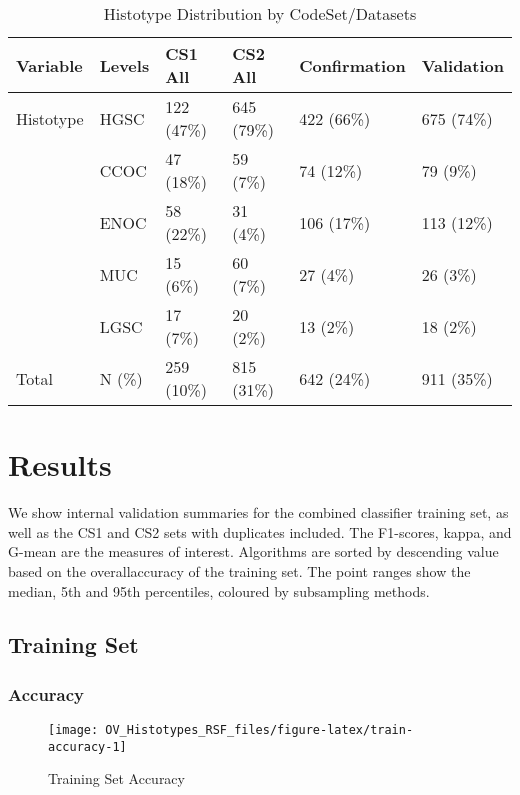 \documentclass[
]{report}
\begin{document}
\begin{table}

\caption{\label{tab:hist-codeset-dataset}Histotype Distribution by CodeSet/Datasets}
\centering
\begin{tabular}[t]{l|l|l|l|l|l}
\hline
Variable & Levels & CS1 All & CS2 All & Confirmation & Validation\\
\hline
Histotype & HGSC & 122 (47\%) & 645 (79\%) & 422 (66\%) & 675 (74\%)\\
\hline
 & CCOC & 47 (18\%) & 59 (7\%) & 74 (12\%) & 79 (9\%)\\
\hline
 & ENOC & 58 (22\%) & 31 (4\%) & 106 (17\%) & 113 (12\%)\\
\hline
 & MUC & 15 (6\%) & 60 (7\%) & 27 (4\%) & 26 (3\%)\\
\hline
 & LGSC & 17 (7\%) & 20 (2\%) & 13 (2\%) & 18 (2\%)\\
\hline
Total & N (\%) & 259 (10\%) & 815 (31\%) & 642 (24\%) & 911 (35\%)\\
\hline
\end{tabular}
\end{table}

\hypertarget{results}{%
\chapter{Results}\label{results}}

We show internal validation summaries for the combined classifier training set, as well as the CS1 and CS2 sets with duplicates included. The F1-scores, kappa, and G-mean are the measures of interest. Algorithms are sorted by descending value based on the overallaccuracy of the training set. The point ranges show the median, 5th and 95th percentiles, coloured by subsampling methods.

\hypertarget{training-set-1}{%
\section{Training Set}\label{training-set-1}}

\hypertarget{accuracy}{%
\subsection{Accuracy}\label{accuracy}}

\begin{figure}[H]

{\centering \texttt{[image: OV\_Histotypes\_RSF\_files/figure-latex/train-accuracy-1]} 

}

\caption{Training Set Accuracy}\label{fig:train-accuracy}
\end{figure}
\end{document}
